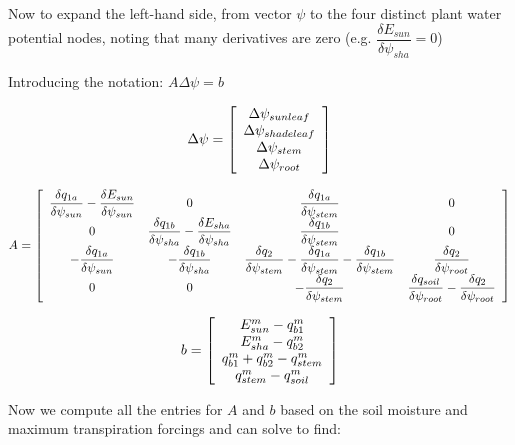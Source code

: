 \documentclass[draft,linenumbers]{agujournal}
\begin{document}
Now to expand the left-hand side, from vector $\psi$ to the four distinct plant water potential nodes, noting that many derivatives are zero (e.g. $\dfrac{\delta E_{sun}}{\delta\psi_{sha}}=0$)

Introducing the notation:
$A\Delta\psi=b$

   \begin{linenomath*} \begin{equation} 
   \Delta\psi=\left[ \begin {array}{c}
   \Delta\psi_{sunleaf} \cr
   \Delta\psi_{shadeleaf} \cr
   \Delta\psi_{stem} \cr
   \Delta\psi_{root}
   \end {array} \right] 
   \end{equation} \end{linenomath*}

   \begin{linenomath*} \begin{equation} 
   A=
   \left[ \begin {array}{cccc}
   \dfrac{\delta q_{1a}}{\delta \psi_{sun}}-\dfrac{\delta E_{sun}}{\delta \psi_{sun}}&0&\dfrac{\delta q_{1a}}{\delta \psi_{stem}}&0\cr
   0&\dfrac{\delta q_{1b}}{\delta \psi_{sha}}-\dfrac{\delta E_{sha}}{\delta \psi_{sha}}&\dfrac{\delta q_{1b}}{\delta \psi_{stem}}&0\cr
   -\dfrac{\delta q_{1a}}{\delta \psi_{sun}}&
   -\dfrac{\delta q_{1b}}{\delta \psi_{sha}}&
   \dfrac{\delta q_2}{\delta \psi_{stem}}-\dfrac{\delta q_{1a}}{\delta \psi_{stem}}-\dfrac{\delta q_{1b}}{\delta \psi_{stem}}&
   \dfrac{\delta q_2}{\delta \psi_{root}}\cr
   0&0&-\dfrac{\delta q_2}{\delta \psi_{stem}}&\dfrac{\delta q_{soil}}{\delta \psi_{root}}-\dfrac{\delta q_2}{\delta \psi_{root}}
   \end {array} \right]
   \end{equation} \end{linenomath*}

   \begin{linenomath*} \begin{equation} 
   b=
   \left[ \begin {array}{c}
   E_{sun}^{m}-q_{b1}^{m} \cr
   E_{sha}^{m}-q_{b2}^{m} \cr
   q_{b1}^{m}+q_{b2}^{m}-q_{stem}^{m} \cr
   q_{stem}^{m}-q_{soil}^{m}
   \end {array} \right]
   \end{equation} \end{linenomath*}

Now we compute all the entries for $A$ and $b$ based on the soil moisture and maximum transpiration forcings and can solve to find:
\end{document}
